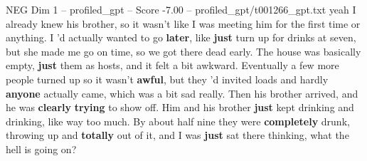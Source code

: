 \begin{textsample}{NEG Dim 1 – profiled\_gpt – Score -7.00 – profiled\_gpt/t001266\_gpt.txt}  \label{ex:f1_neg_015}
yeah I already knew his brother, so it wasn't like I was meeting him for the first time or anything.
I ’d actually wanted to go \textbf{later}, like \textbf{just} turn up for drinks at seven, but she made me go on time, so we got there dead early.
The house was basically empty, \textbf{just} them as hosts, and it felt a bit awkward.
Eventually a few more people turned up so it wasn't \textbf{awful}, but they ’d invited loads and hardly \textbf{anyone} actually came, which was a bit sad really.
Then his brother arrived, and he was \textbf{clearly} \textbf{trying} to show off.
Him and his brother \textbf{just} kept drinking and drinking, like way too much.
By about half nine they were \textbf{completely} drunk, throwing up and \textbf{totally} out of it, and I was \textbf{just} sat there thinking, what the hell is going on?

\end{textsample}
